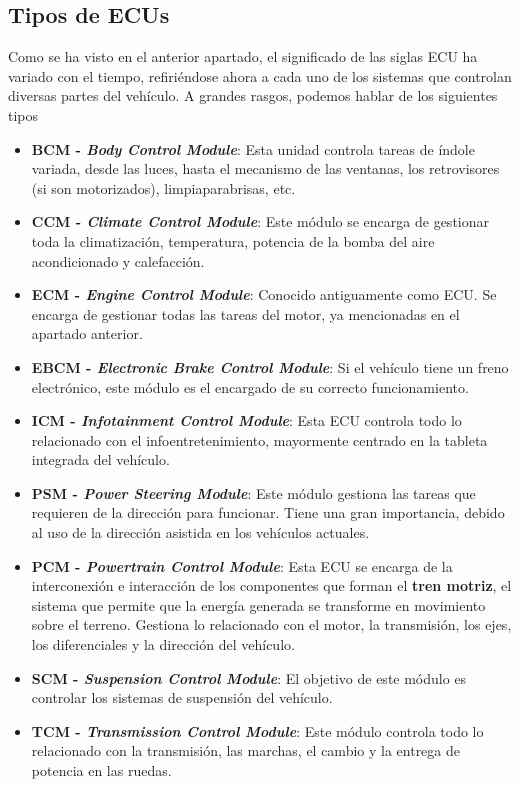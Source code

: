 \newpage


\subsection{Tipos de ECUs}
Como se ha visto en el anterior apartado, el significado de las siglas ECU ha variado con el tiempo, refiriéndose ahora a cada uno de los sistemas que controlan diversas partes del vehículo. A grandes rasgos, podemos hablar de los siguientes tipos\cite{ecu_tipos}
\begin{itemize}
    \item \textbf{BCM - \textit{Body Control Module}}: Esta unidad controla tareas de índole variada, desde las luces, hasta el mecanismo de las ventanas, los retrovisores (si son motorizados), limpiaparabrisas, etc. \cite{bcm}
    \item \textbf{CCM - \textit{Climate Control Module}}: Este módulo se encarga de gestionar toda la climatización, temperatura, potencia de la bomba del aire acondicionado y calefacción.
    \item \textbf{ECM - \textit{Engine Control Module}}: Conocido antiguamente como ECU. Se encarga de gestionar todas las tareas del motor, ya mencionadas en el apartado anterior.
    \item \textbf{EBCM - \textit{Electronic Brake Control Module}}: Si el vehículo tiene un freno electrónico, este módulo es el encargado de su correcto funcionamiento.
    \item \textbf{ICM - \textit{Infotainment Control Module}}: Esta ECU controla todo lo relacionado con el infoentretenimiento, mayormente centrado en la tableta integrada del vehículo.
    \item \textbf{PSM - \textit{Power Steering Module}}: Este módulo gestiona las tareas que requieren de la dirección para funcionar. Tiene una gran importancia, debido al uso de la dirección asistida en los vehículos actuales.
    \item \textbf{PCM - \textit{Powertrain Control Module}}: Esta ECU se encarga de la interconexión e interacción de los componentes que forman el \textbf{tren motriz}, el sistema que permite que la energía generada se transforme en movimiento sobre el terreno. Gestiona lo relacionado con el motor, la transmisión, los ejes, los diferenciales y la dirección del vehículo. 
    \item \textbf{SCM - \textit{Suspension Control Module}}: El objetivo de este módulo es controlar los sistemas de suspensión del vehículo.
    \item \textbf{TCM - \textit{Transmission Control Module}}: Este módulo controla todo lo relacionado con la transmisión, las marchas, el cambio y la entrega de potencia en las ruedas.
\end{itemize}
\newpage
